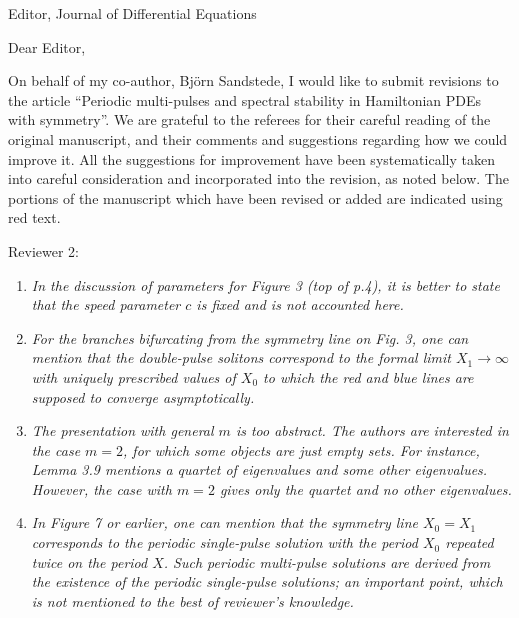 \documentclass[11pt]{letter}
\begin{document}
\address{Ross Parker \\
Department of Mathematics \\
Southern Methodist University \\
Dallas, TX 75275 \\
\texttt{rhparker@smu.edu}}%
\signature{Ross Parker}
\begin{letter}{Editor, Journal of Differential Equations}

\opening{Dear Editor,}

On behalf of my co-author, Bj\"orn Sandstede, I would like to submit revisions to the article ``Periodic multi-pulses and spectral stability in Hamiltonian PDEs with symmetry''. We are grateful to the referees for their careful reading of the original manuscript, and their comments and suggestions regarding how we could improve it. All the suggestions for improvement have been systematically taken into careful consideration and incorporated into the revision, as noted below. The portions of the manuscript which have been revised or added are indicated using red text.

Reviewer 2:
\begin{enumerate}
    \item \emph{In the discussion of parameters for Figure 3 (top of p.4), it is better to state that the speed parameter $c$ is fixed and is not accounted here.}
    \vspace{4mm}

    \item \emph{For the branches bifurcating from the symmetry line on Fig. 3, one can mention that the double-pulse solitons correspond to the formal limit $X_1 \rightarrow \infty$ with uniquely prescribed values of $X_0$ to which the red and blue lines are supposed to converge asymptotically.}
    \vspace{4mm}

    \item \emph{The presentation with general $m$ is too abstract. The authors are interested in the case $m = 2$, for which some objects are just empty sets. For instance, Lemma 3.9 mentions a quartet of eigenvalues and some other eigenvalues. However, the case with $m = 2$ gives only the quartet and no other eigenvalues.}
    \vspace{4mm}

    \item \emph{In Figure 7 or earlier, one can mention that the symmetry line $X_0 = X_1$ corresponds to the periodic single-pulse solution with the period $X_0$ repeated twice on the period $X$. Such periodic multi-pulse solutions are derived from the existence of the periodic single-pulse solutions; an important point, which is not mentioned to the best of reviewer’s knowledge.}
    \vspace{4mm}


\end{enumerate}
\end{letter}
\end{document}
